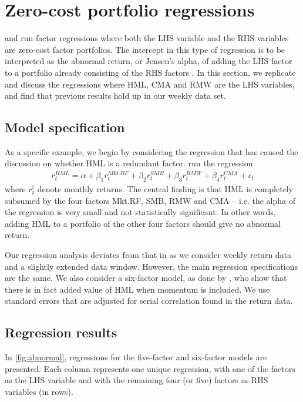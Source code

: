 
\section{Zero-cost portfolio regressions}
\label{sec:alpha_reg}
\textcite{FF2015} and \textcite{Asness2015} run factor regressions where both the LHS variable and the RHS variables are zero-cost factor portfolios. The intercept in this type of regression is to be interpreted as the abnormal return, or Jensen's alpha, of adding the LHS factor to a portfolio already consisting of the RHS factors \autocite{Jensen1968}. In this section, we replicate and discuss the regressions where HML, CMA and RMW are the LHS variables, and find that previous results hold up in our weekly data set.

\subsection{Model specification}

As a specific example, we begin by considering the regression that has caused the discussion on whether HML is a redundant factor. \textcite{FF2015} run the regression
\begin{align}
  r^{HML}_t = \alpha + \beta_1 r^{Mkt.RF}_t + \beta_2 r^{SMB}_t + \beta_3 r^{RMW}_t + \beta_4 r^{CMA}_t + \epsilon_t
\end{align}
where $r^i_t$ denote monthly returns. The central finding is that HML is completely subsumed by the four factors Mkt.RF, SMB, RMW and CMA -- i.e. the alpha of the regression is very small and not statistically significant. In other words, adding HML to a portfolio of the other four factors should give no abnormal return.

Our regression analysis deviates from that in \textcite{FF2015} as we consider weekly return data and a slightly extended data window. However, the main regression specifications are the same. We also consider a six-factor model, as done by \textcite{Asness2015}, who show that there is in fact added value of HML when momentum is included. We use standard errors that are adjusted for serial correlation found in the return data.

\subsection{Regression results}

In \autoref{fig:abnormal}, regressions for the five-factor and six-factor models are presented. Each column represents one unique regression, with one of the factors as the LHS variable and with the remaining four (or five) factors as RHS variables (in rows).

